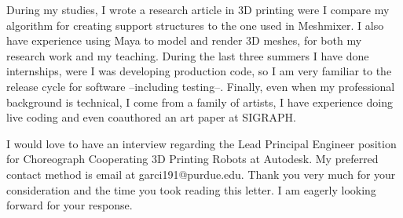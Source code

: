 \documentclass[10pt,stdletter,dateno,sigleft,letterpaper]{newlfm} %
\begin{document}
\begin{newlfm}

During my studies, I wrote a research article in 3D printing were I compare my algorithm for creating support structures to the one used in Meshmixer. I also have experience using Maya to model and render 3D meshes, for both my research work and my teaching. During the last three summers I have done internships, were I was developing production code, so I am very familiar to the release cycle for software --including testing--. Finally, even when my professional background is technical, I come from a family of artists, I have experience doing live coding and even coauthored an art paper at SIGRAPH.

I would love to have an interview regarding the Lead Principal Engineer position for Choreograph Cooperating 3D Printing Robots at Autodesk. My preferred contact method is email at garci191@purdue.edu. Thank you very much for your consideration and the time you took reading this letter. I am eagerly looking forward for your response.



\end{newlfm}
\end{document}
